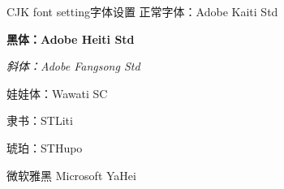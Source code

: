 \begin{frame}{CJK font setting\hfill 字体设置}
	\linespread{1.2}
	正常字体：Adobe Kaiti Std
	
	{\bfseries 黑体：Adobe Heiti Std}
	
	{\itshape 斜体：Adobe Fangsong Std}
	
	{ 娃娃体：Wawati SC}
	
	{ 隶书：STLiti}
	
	{ 琥珀：STHupo}
	
	{ 微软雅黑 Microsoft YaHei}
	
	
	
\end{frame}